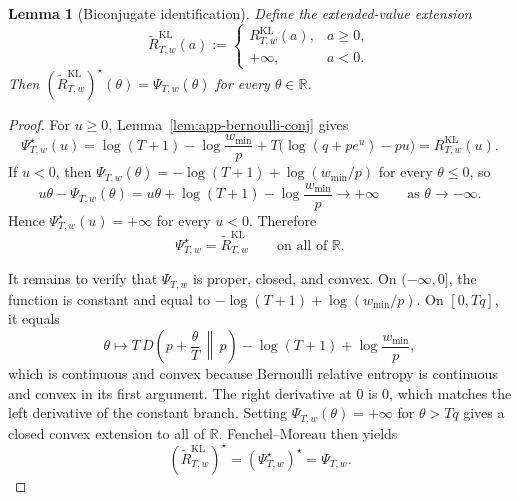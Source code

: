 \documentclass[11pt]{article}
\newtheorem{lemma}{Lemma}
\newcommand{\R}{\mathbb{R}}
\newcommand{\1}{\mathbf{1}}
\begin{document}
\begin{lemma}[Biconjugate identification]
\label{lem:app-biconj}
Define the extended-value extension
\[
\widetilde R_{T,w}^{\mathrm{KL}}(a)
:=
\begin{cases}
R_{T,w}^{\mathrm{KL}}(a), & a\ge 0,\\
+\infty, & a<0.
\end{cases}
\]
Then \((\widetilde R_{T,w}^{\mathrm{KL}})^\star(\theta)=\Psi_{T,w}(\theta)\) for every \(\theta\in\R\).
\end{lemma}

\begin{proof}
For \(u\ge 0\), Lemma~\ref{lem:app-bernoulli-conj} gives
\[
\Psi_{T,w}^\star(u)=\log(T+1)-\log\frac{w_{\min}}{p}+T\bigl(\log(q+pe^u)-pu\bigr)=R_{T,w}^{\mathrm{KL}}(u).
\]
If \(u<0\), then \(\Psi_{T,w}(\theta)=-\log(T+1)+\log(w_{\min}/p)\) for every \(\theta\le 0\), so
\[
u\theta-\Psi_{T,w}(\theta)=u\theta+\log(T+1)-\log\frac{w_{\min}}{p}\to+\infty
\qquad\text{as }\theta\to-\infty.
\]
Hence \(\Psi_{T,w}^\star(u)=+\infty\) for every \(u<0\). Therefore
\[
\Psi_{T,w}^\star=\widetilde R_{T,w}^{\mathrm{KL}}
\qquad\text{on all of }\R.
\]

It remains to verify that \(\Psi_{T,w}\) is proper, closed, and convex. On \((-\infty,0]\), the function is constant and equal to \(-\log(T+1)+\log(w_{\min}/p)\). On \([0,Tq]\), it equals
\[
\theta\mapsto T\,D\!\left(p+\frac{\theta}{T}\,\middle\|\,p\right)-\log(T+1)+\log\frac{w_{\min}}{p},
\]
which is continuous and convex because Bernoulli relative entropy is continuous and convex in its first argument. The right derivative at \(0\) is \(0\), which matches the left derivative of the constant branch. Setting \(\Psi_{T,w}(\theta)=+\infty\) for \(\theta>Tq\) gives a closed convex extension to all of \(\R\). Fenchel--Moreau then yields
\[
(\widetilde R_{T,w}^{\mathrm{KL}})^\star
=
(\Psi_{T,w}^\star)^\star
=
\Psi_{T,w}.
\]
\end{proof}
\end{document}
